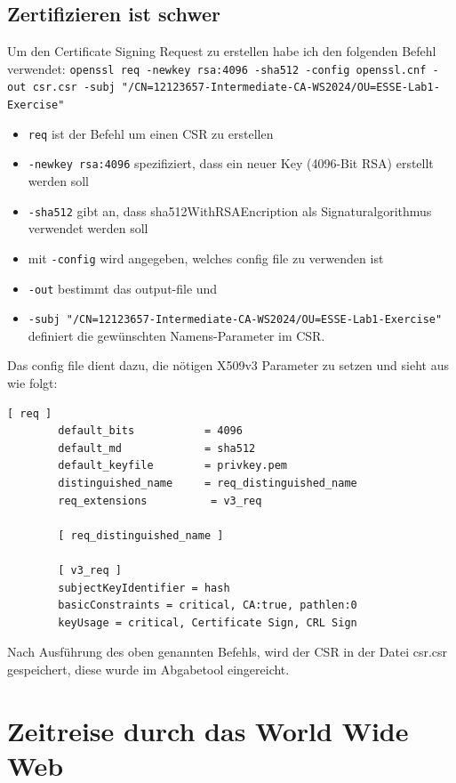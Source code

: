 \documentclass[12pt, a4paper, titlepage, oneside]{scrartcl}
\begin{document}
	\subsection{Zertifizieren ist schwer}
	Um den Certificate Signing Request zu erstellen habe ich den folgenden Befehl
	verwendet: \lstinline{openssl req -newkey rsa:4096 -sha512 -config openssl.cnf -out csr.csr -subj "/CN=12123657-Intermediate-CA-WS2024/OU=ESSE-Lab1-Exercise"}
	\begin{itemize}
		\item \lstinline{req} ist der Befehl um einen CSR zu erstellen

		\item \lstinline{-newkey rsa:4096} spezifiziert, dass ein neuer Key (4096-Bit
			RSA) erstellt werden soll

		\item \lstinline{-sha512} gibt an, dass sha512WithRSAEncription als Signaturalgorithmus
			verwendet werden soll

		\item mit \lstinline{-config} wird angegeben, welches config file zu verwenden
			ist

		\item \lstinline{-out} bestimmt das output-file und

		\item \lstinline{-subj "/CN=12123657-Intermediate-CA-WS2024/OU=ESSE-Lab1-Exercise"}
			definiert die gewünschten Namens-Parameter im CSR.
	\end{itemize}
	Das config file dient dazu, die nötigen X509v3 Parameter zu setzen und sieht aus
	wie folgt:
	\begin{lstlisting}[caption=openssl.cnf,label=code:opensslConfig,style=simple]
		[ req ]
		default_bits           = 4096
		default_md             = sha512
		default_keyfile        = privkey.pem
		distinguished_name     = req_distinguished_name
		req_extensions          = v3_req

		[ req_distinguished_name ]

		[ v3_req ]
		subjectKeyIdentifier = hash
		basicConstraints = critical, CA:true, pathlen:0
		keyUsage = critical, Certificate Sign, CRL Sign
	\end{lstlisting}
	Nach Ausführung des oben genannten Befehls, wird der CSR in der Datei csr.csr gespeichert,
	diese wurde im Abgabetool eingereicht.

	\section{Zeitreise durch das World Wide Web}
\end{document}
